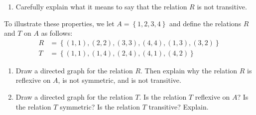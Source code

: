 \begin{previewactivity}
\begin{enumerate}
\item Carefully explain what it means to say that the relation  $R$  is not transitive.
\end{enumerate}
To illustrate these properties, we let  $A = \left\{ {1, 2, 3, 4} \right\}$ and define the relations $R$ and $T$ on $A$ as follows:
\begin{align*}
R &= \left\{ {( {1, 1} ), ( {2, 2} ), ( {3, 3} ), ( {4, 4} ), ( {1, 3} ), ( {3, 2} )} \right\} \\
T &= \left\{ {( {1, 1} ), ( {1, 4} ), ( {2, 4} ), ( {4, 1} ), ( {4, 2} )} \right\}
\end{align*}
\setcounter{oldenumi}{\theenumi}
\begin{enumerate} \setcounter{enumi}{\theoldenumi}
\item Draw a directed graph for the relation $R$. Then explain why the relation $R$ is reflexive on $A$, is not symmetric, and is not transitive.
\item Draw a directed graph for the relation $T$.  Is the relation $T$ reflexive on $A$?  Is the relation $T$ symmetric?  Is the relation $T$ transitive?  Explain. 
\end{enumerate}
%
%

\end{previewactivity}
